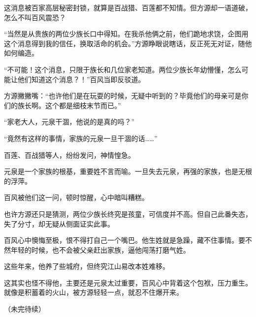 \begin{this_body}
这消息被百家高层秘密封锁，就算是百战猎、百莲都不知情。但方源却一语道破，怎么不叫百风震恐？

“当然是从贵族的两位少族长口中得知。在我杀他俩之前，他们跪地求饶，企图用这个消息得到我的信任，换取活命的机会。”方源睁眼说瞎话，反正死无对证，随他如何编造。

“不可能！这个消息，只限于族长和几位家老知道。两位少族长年幼懵懂，怎么可能让他们知道这个消息？！”百风当即反驳道。

方源撇撇嘴：“也许他们是在玩耍的时候，无疑中听到的？毕竟他们的母亲可是你们的族长啊。这个都是细枝末节而已。”

“家老大人，元泉干涸，他说的是真的吗？”

“竟然有这样的事情，家族的元泉一旦干涸的话……”

百莲、百战猎等人，纷纷发问，神情惶急。

元泉是一个家族的根基，重要姓不言而喻。一旦失去元泉，再强的家族，也是无根的浮萍。

百风被他们这一问，顿时惊醒，心中暗叫糟糕。

也许方源还只是猜测，两位少族长终究是孩童，可信度并不高。但自己此番失态，失了分寸，却无疑从侧面证实此事。

百风心中懊悔至极，恨不得打自己一个嘴巴。他生姓就是急躁，藏不住事情。要不然年轻的时候，也不会被父亲赶出家族，逼他闯荡打磨气姓。

这些年来，他养了些城府，但终究江山易改本姓难移。

这其实也怪不得他，主要还是元泉太过重要，百风心中背着这个包袱，压力重生。就像是积蓄着的火山，被方源轻轻一点，就忍不住爆开来。

（未完待续）

\end{this_body}

